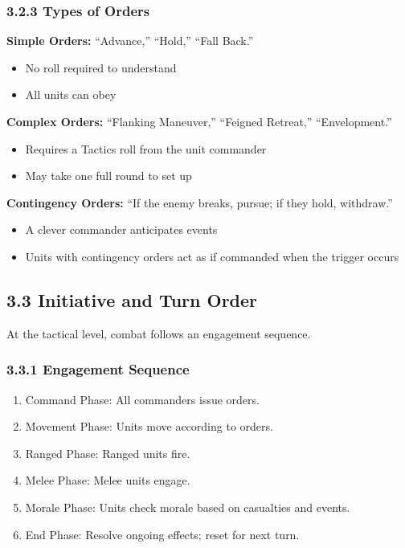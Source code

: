 \documentclass[11pt]{article}
\begin{document}
\subsubsection{3.2.3 Types of Orders}

\textbf{Simple Orders:} ``Advance,'' ``Hold,'' ``Fall Back.''\\
\begin{itemize}
  \item No roll required to understand
  \item All units can obey
\end{itemize}

\textbf{Complex Orders:} ``Flanking Maneuver,'' ``Feigned Retreat,'' ``Envelopment.''\\
\begin{itemize}
  \item Requires a Tactics roll from the unit commander
  \item May take one full round to set up
\end{itemize}

\textbf{Contingency Orders:} ``If the enemy breaks, pursue; if they hold, withdraw.''\\
\begin{itemize}
  \item A clever commander anticipates events
  \item Units with contingency orders act as if commanded when the trigger occurs
\end{itemize}

\subsection{3.3 Initiative and Turn Order}

At the tactical level, combat follows an engagement sequence.

\subsubsection{3.3.1 Engagement Sequence}

\begin{enumerate}
  \item Command Phase: All commanders issue orders.
  \item Movement Phase: Units move according to orders.
  \item Ranged Phase: Ranged units fire.
  \item Melee Phase: Melee units engage.
  \item Morale Phase: Units check morale based on casualties and events.
  \item End Phase: Resolve ongoing effects; reset for next turn.
\end{enumerate}
\end{document}
